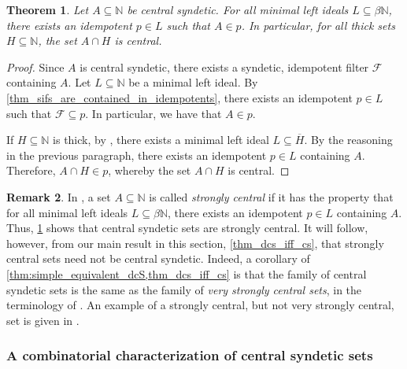 \documentclass[letter,11pt]{article}
\theoremstyle{plain}
\newtheorem{theorem}{Theorem}
\theoremstyle{definition}
\newtheorem{remark}[theorem]{Remark}
\theoremstyle{plain}
\theoremstyle{plain}
\numberwithin{equation}{section}
\newcommand{\N}{\mathbb{N}}
\newcommand{\family}{\mathscr{F}}
\begin{document}
\begin{theorem}
\label{cor_central_syndetic_is_strongly_central}
    Let $A \subseteq \N$ be central syndetic.  For all minimal left ideals $L \subseteq \beta \N$, there exists an idempotent $p \in L$ such that $A \in p$.  In particular, for all thick sets $H \subseteq \N$, the set $A \cap H$ is central.
\end{theorem}

\begin{proof}
    Since $A$ is central syndetic, there exists a syndetic, idempotent filter $\family$ containing $A$. Let $L \subseteq \N$ be a minimal left ideal. By \cref{thm_sifs_are_contained_in_idempotents}, there exists an idempotent $p \in L$ such that $\family \subseteq p$.  In particular, we have that $A \in p$.

    If $H \subseteq \N$ is thick, by \cite[Thm. 4.48]{hindman_strauss_book_2012}, there exists a minimal left ideal $L \subseteq \overline{H}$.  By the reasoning in the previous paragraph, there exists an idempotent $p \in L$ containing $A$.  Therefore, $A \cap H \in p$, whereby the set $A \cap H$ is central.
\end{proof}

\begin{remark}
    In \cite{bergelson_hindman_strauss_2012}, a set $A \subseteq \N$ is called \emph{strongly central} if it has the property that for all minimal left ideals $L \subseteq \beta \N$, there exists an idempotent $p \in L$ containing $A$.  Thus, \cref{cor_central_syndetic_is_strongly_central} shows that central syndetic sets are strongly central.  It will follow, however, from our main result in this section, \cref{thm_dcs_iff_cs}, that strongly central sets need not be central syndetic.  Indeed, a corollary of \cref{thm:simple_equivalent_dcS,thm_dcs_iff_cs} is that the family of central syndetic sets is the same as the family of \emph{very strongly central sets}, in the terminology of \cite{bergelson_hindman_strauss_2012}.  An example of a strongly central, but not very strongly central, set is given in \cite[Thm. 2.17]{bergelson_hindman_strauss_2012}.
\end{remark}

   

\subsubsection{A combinatorial characterization of central syndetic sets}
\label{sec_combo_condition_for_central_syndetic}
\end{document}
